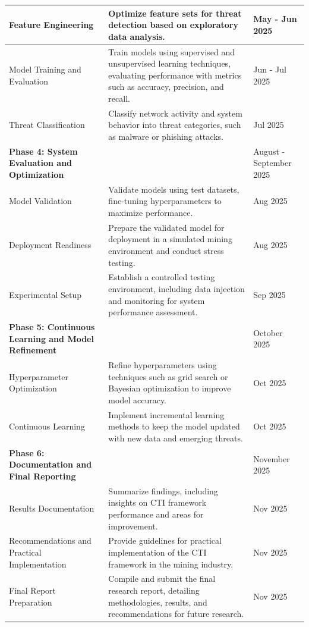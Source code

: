 \documentclass[a4paper,twoside,12pt]{report}
\begin{document}
\begin{longtable}{|p{4cm}|p{9.5cm}|p{2.5cm}|}
    \hline
    Feature Engineering & Optimize feature sets for threat detection based on exploratory data analysis. & May - Jun 2025 \\
    \hline
    Model Training and Evaluation & Train models using supervised and unsupervised learning techniques, evaluating performance with metrics such as accuracy, precision, and recall. & Jun - Jul 2025 \\
    \hline
    Threat Classification & Classify network activity and system behavior into threat categories, such as malware or phishing attacks. & Jul 2025 \\
    \hline
    \textbf{Phase 4: System Evaluation and Optimization} & & August - September 2025 \\
    \hline
    Model Validation & Validate models using test datasets, fine-tuning hyperparameters to maximize performance. & Aug 2025 \\
    \hline
    Deployment Readiness & Prepare the validated model for deployment in a simulated mining environment and conduct stress testing. & Aug 2025 \\
    \hline
    Experimental Setup & Establish a controlled testing environment, including data injection and monitoring for system performance assessment. & Sep 2025 \\
    \hline
    \textbf{Phase 5: Continuous Learning and Model Refinement} & & October 2025 \\
    \hline
    Hyperparameter Optimization & Refine hyperparameters using techniques such as grid search or Bayesian optimization to improve model accuracy. & Oct 2025 \\
    \hline
    Continuous Learning & Implement incremental learning methods to keep the model updated with new data and emerging threats. & Oct 2025 \\
    \hline
    \textbf{Phase 6: Documentation and Final Reporting} & & November 2025 \\
    \hline
    Results Documentation & Summarize findings, including insights on CTI framework performance and areas for improvement. & Nov 2025 \\
    \hline
    Recommendations and Practical Implementation & Provide guidelines for practical implementation of the CTI framework in the mining industry. & Nov 2025 \\
    \hline
    Final Report Preparation & Compile and submit the final research report, detailing methodologies, results, and recommendations for future research. & Nov 2025 \\
\end{longtable}
\end{document}
